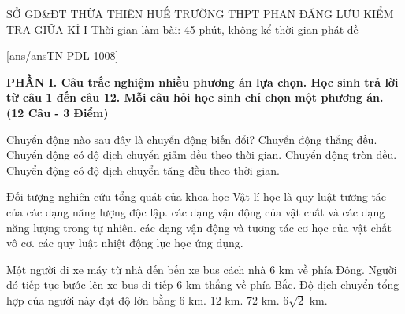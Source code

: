 \def\toanlop{10}
\def\thoigian{45}
\def\namhoc{2024 - 2025}
\begin{dethi}
	{SỞ GD\&ĐT THỪA THIÊN HUẾ}
	{TRƯỜNG THPT PHAN ĐĂNG LƯU}
	{KIỂM TRA GIỮA KÌ I}
	{Thời gian làm bài: 45 phút, không kể thời gian phát đề}
\end{dethi}

[ans/ansTN-PDL-1008]

\noindent \textbf{PHẦN I. Câu trắc nghiệm nhiều phương án lựa chọn. Học sinh trả lời từ câu 1 đến câu 12. Mỗi câu hỏi học sinh chỉ chọn một phương án. (12 Câu - 3 Điểm)}
\vspace{0.2cm}

\begin{ex}%
	Chuyển động nào sau đây là chuyển động biến đổi?
	\choice
	{Chuyển động thẳng đều.}
	{Chuyển động có độ dịch chuyển giảm đều theo thời gian.}
	{\True Chuyển động tròn đều.}
	{Chuyển động có độ dịch chuyển tăng đều theo thời gian.}
\end{ex}

\begin{ex}%
	Đối tượng nghiên cứu tổng quát của khoa học Vật lí học là
	\choice
	{quy luật tương tác của các dạng năng lượng độc lập.}
	{\True các dạng vận động của vật chất và các dạng năng lượng trong tự nhiên.}
	{các dạng vận động và tương tác cơ học của vật chất vô cơ.}
	{các quy luật nhiệt động lực học ứng dụng.}
\end{ex}

\begin{ex}%
	Một người đi xe máy từ nhà đến bến xe bus cách nhà $6\text{ km}$ về phía Đông. Người đó tiếp tục bước lên xe bus đi tiếp $6\text{ km}$ thẳng về phía Bắc. Độ dịch chuyển tổng hợp của người này đạt độ lớn bằng
	\choice
	{$6\text{ km}$.}
	{$12\text{ km}$.}
	{$72\text{ km}$.}
	{\True $6\sqrt{2}\text{ km}$.}
\end{ex}

